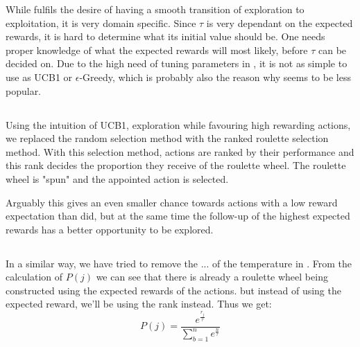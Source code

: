 While \soft fulfils the desire of having a smooth transition of exploration to exploitation, it is very domain specific. Since $\tau$ is very dependant on the expected rewards, it is hard to determine what its initial value should be. One needs proper knowledge of what the expected rewards will most likely, before $\tau$ can be decided on. Due to the high need of tuning parameters in \soft, it is not as simple to use as UCB1 or $\epsilon$-Greedy, which is probably also the reason why seems to be less popular.

\subsection{\eroulette} 
\label{subsec:roulette}
Using the intuition of UCB1, exploration while favouring high rewarding actions, we replaced the random selection method with the ranked roulette selection method. With this selection method, actions are ranked by their performance and this rank decides the proportion they receive of the roulette wheel. The roulette wheel is "spun" and the appointed action is selected.

Arguably this gives an even smaller chance towards actions with a low reward expectation than \egreedy did, but at the same time the follow-up of the highest expected rewards has a better opportunity to be explored. 

\subsection{\rsoft}
In a similar way, we have tried to remove the ... of the temperature in \soft. From the calculation of $P(j)$ we can see that there is already a roulette wheel being constructed using the expected rewards of the actions. but instead of using the expected reward, we'll be using the rank instead. Thus we get:
\begin{equation}
P(j) = \frac{e^\frac{r_j}{\tau}}{\sum_{b=1}^{n} e^\frac{n}{\tau}}
\end{equation}